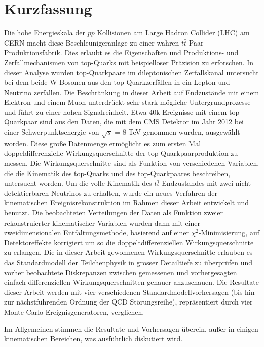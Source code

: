 \thispagestyle{empty}
\vspace{-3cm}
\section*{\centering Kurzfassung}

\vspace{\baselineskip}

Die hohe Energieskala der $pp$ Kollisionen am Large Hadron Collider (LHC) am CERN macht
diese Beschleunigeranlage zu einer wahren $t\bar{t}$-Paar Produktionsfabrik. 
%
Dies erlaubt es die Eigenschaften und
Produktions- und Zerfallmechanismen von top-Quarks mit beispielloser Pr{\"a}zision zu erforschen.
%
In dieser Analyse wurden top-Quarkpaare im dileptonischen 
Zerfallskanal untersucht bei dem beide W-Bosonen aus den top-Quarkzerf\"allen
in ein Lepton und Neutrino zerfallen.
%
Die Beschr\"ankung in dieser Arbeit auf Endzust\"ande mit einem Elektron und einem Muon
unterdr\"uckt sehr stark m\"ogliche Untergrundprozesse und f\"uhrt zu einer hohen Signalreinheit.
%
Etwa 40k Ereignisse mit einem top-Quarkpaar sind aus den
Daten, die mit dem CMS Detektor im Jahr 2012 bei einer Schwerpunktsenergie
von  $\sqrt{s}$ = 8 TeV genommen wurden, ausgew{\"a}hlt worden. 
%
Diese gro{\ss}e Datenmenge erm\"oglicht es zum ersten Mal 
doppeldifferenzielle Wirkungsquerschnitte der top-Quarkpaarproduktion
zu messen.
%
Die Wirkungsquerschnitte sind als Funktion von verschiedenen Variablen, die die Kinematik des
top-Quarks und des top-Quarkpaares beschreiben, untersucht worden.
%
Um die volle Kinematik des $t\bar{t}$ Endzustandes mit zwei nicht detektierbaren Neutrinos 
zu erhalten, wurde ein neues Verfahren der kinematischen Ereignisrekonstruktion im Rahmen dieser Arbeit entwickelt und benutzt. 
%
Die beobachteten Verteilungen der Daten als Funktion zweier rekonstruierter kinematischer
Variablen wurden dann mit einer zweidimensionalen Entfaltungsmethode, basierend
auf einer $\chi^2$-Minimisierung,  auf Detektoreffekte
korrigiert um so die doppeltdifferenziellen Wirkungsquerschnitte zu erlangen.
%
Die in dieser Arbeit gewonnenen Wirkungsquerschnitte erlauben 
es das  Standardmodell der Teilchenphysik in grosser Detailtiefe 
zu {\"u}berpr{\"u}fen und vorher beobachtete Diskrepanzen zwischen gemessenen und vorhergesagten 
einfach-differenziellen Wirkungsquerschnitten genauer anzuschauen. 
%
Die Resultate dieser Arbeit werden mit vier verschiedenen 
Standardmodellvorhersagen (bis hin zur n\"achstf\"uhrenden Ordnung der QCD St\"orungsreihe),
repr\"asentiert durch vier Monte Carlo Ereignisgeneratoren, verglichen.

Im Allgemeinen stimmen die Resultate und Vorhersagen {\"u}berein, au{\ss}er in einigen kinematischen
Bereichen, was ausf{\"u}hrlich diskutiert wird.

\newpage
\thispagestyle{empty}
\mbox{}